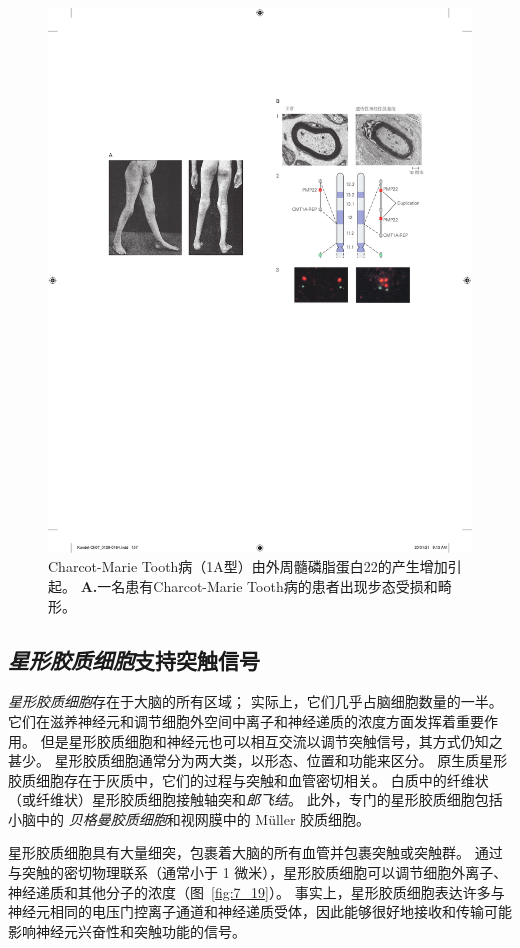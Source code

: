 \begin{figure}[htbp]
	\centering
	\includegraphics[width=0.5\linewidth]{chap07/fig_7_18}
	\caption{Charcot-Marie Tooth病（1A型）由外周髓磷脂蛋白22的产生增加引起。
	\textbf{A.}一名患有Charcot-Marie Tooth病的患者出现步态受损和畸形。}
	\label{fig:7_18}
\end{figure}




\subsection{\textit{星形胶质细胞}支持突触信号}

\textit{星形胶质细胞}存在于大脑的所有区域；
实际上，它们几乎占脑细胞数量的一半。
它们在滋养神经元和调节细胞外空间中离子和神经递质的浓度方面发挥着重要作用。
但是星形胶质细胞和神经元也可以相互交流以调节突触信号，其方式仍知之甚少。
星形胶质细胞通常分为两大类，以形态、位置和功能来区分。
原生质星形胶质细胞存在于灰质中，它们的过程与突触和血管密切相关。
白质中的纤维状（或纤维状）星形胶质细胞接触轴突和\textit{郎飞结}。
此外，专门的星形胶质细胞包括小脑中的 \textit{贝格曼胶质细胞}和视网膜中的 Müller 胶质细胞。


星形胶质细胞具有大量细突，包裹着大脑的所有血管并包裹突触或突触群。
通过与突触的密切物理联系（通常小于 1 微米），星形胶质细胞可以调节细胞外离子、神经递质和其他分子的浓度（图~\ref{fig:7_19}）。
事实上，星形胶质细胞表达许多与神经元相同的电压门控离子通道和神经递质受体，因此能够很好地接收和传输可能影响神经元兴奋性和突触功能的信号。


